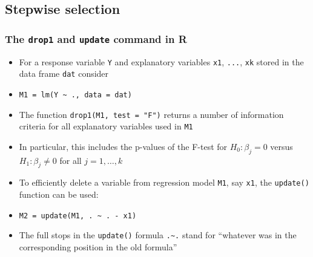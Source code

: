 \documentclass[a4paper]{article}\usepackage[]{graphicx}\usepackage[]{xcolor}
\begin{document}
\subsection{Stepwise selection}
\subsubsection{The \lstinline|drop1| and \lstinline|update| command in R}
\begin{itemize}
	\item For a response variable \lstinline|Y| and explanatory variables \lstinline|x1|, \lstinline|...|, \lstinline|xk| stored in the data frame \lstinline|dat| consider
	\item \lstinline|M1 = lm(Y ~ ., data = dat)|
	\item The function \lstinline|drop1(M1, test = "F")| returns a number of information criteria for all explanatory variables used in \lstinline|M1|
	\item In particular, this includes the p-values of the F-test for \( H_0: \beta_j = 0 \) versus \( H_1: \beta_j \neq 0 \) for all \( j = 1,\dotsc,k \) 
	\item To efficiently delete a variable from regression model \lstinline|M1|, say \lstinline|x1|, the \lstinline|update()| function can be used:
	\item \lstinline|M2 = update(M1, . ~ . - x1)|
	\item The full stops in the \lstinline|update()| formula \lstinline|.~.| stand for ``whatever was in the corresponding position in the old formula''
\end{itemize}
\end{document}
